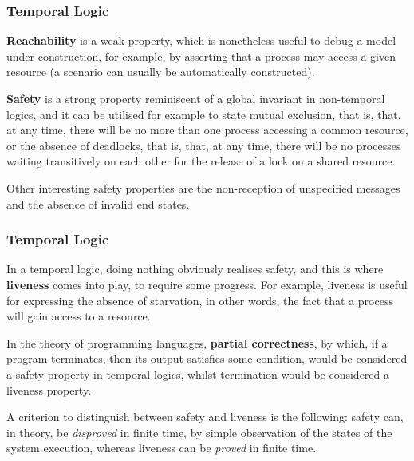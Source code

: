 \documentclass[compress,dvipdfmx]{beamer}
\begin{document}
\begin{frame}
  \frametitle{Temporal Logic}

  \textbf{Reachability} is a weak property, which is nonetheless useful to
  debug a model under construction, for example, by asserting that a
  process may access a given resource (a scenario can usually be
  automatically constructed).

  \bigskip

  \textbf{Safety} is a strong property reminiscent of a global
  invariant in non\hyp{}temporal logics, and it can be utilised for
  example to state mutual exclusion, that is, that, at any time, there
  will be no more than one process accessing a common resource, or the
  absence of deadlocks, that is, that, at any time, there will be no
  processes waiting transitively on each other for the release of a
  lock on a shared resource.

  \bigskip

  Other interesting safety properties are the non\hyp{}reception of
  unspecified messages and the absence of invalid end states.

\end{frame}


\begin{frame}
  \frametitle{Temporal Logic}

  In a temporal logic, doing nothing obviously realises safety, and
  this is where \textbf{liveness} comes into play, to require some
  progress. For example, liveness is useful for expressing the absence
  of starvation, in other words, the fact that a process will gain
  access to a resource.

  \bigskip

  In the theory of programming languages, \textbf{partial
    correctness}, by which, if a program terminates, then its output
  satisfies some condition, would be considered a safety property in
  temporal logics, whilst termination would be considered a liveness
  property.

  \bigskip

  A criterion to distinguish between safety and liveness is the
  following: safety can, in theory, be \emph{disproved} in finite
  time, by simple observation of the states of the system execution,
  whereas liveness can be \emph{proved} in finite time.

\end{frame}
\end{document}
